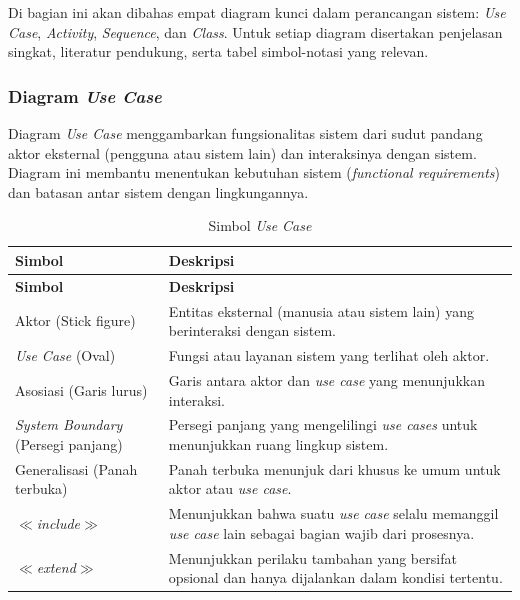 Di bagian ini akan dibahas empat diagram kunci dalam perancangan sistem: \textit{Use Case}, \textit{Activity}, \textit{Sequence}, dan \textit{Class}. Untuk setiap diagram disertakan penjelasan singkat, literatur pendukung, serta tabel simbol-notasi yang relevan.\par

\subsubsection{Diagram \textit{Use Case}} \label{II.DiagramUseCase}
Diagram \textit{Use Case} menggambarkan fungsionalitas sistem dari sudut pandang aktor eksternal (pengguna atau sistem lain) dan interaksinya dengan sistem. Diagram ini membantu menentukan kebutuhan sistem (\textit{functional requirements}) dan batasan antar sistem dengan lingkungannya.\par

\begin{longtable}{|p{}|p{}|}
	\caption{Simbol \textit{Use Case}}
	\label{table:2.simbolUseCase}\\
	\hline
	\textbf{Simbol} & \textbf{Deskripsi} \\
	\hline
	\endfirsthead
	\hline
	\textbf{Simbol} & \textbf{Deskripsi} \\
	\hline
	\endhead
	Aktor (Stick figure) & Entitas eksternal (manusia atau sistem lain) yang berinteraksi dengan sistem. \\
	\hline
	\textit{Use Case} (Oval) & Fungsi atau layanan sistem yang terlihat oleh aktor. \\
	\hline
	Asosiasi (Garis lurus) & Garis antara aktor dan \textit{use case} yang menunjukkan interaksi. \\
	\hline
	\textit{System Boundary} (Persegi panjang) & Persegi panjang yang mengelilingi \textit{use cases} untuk menunjukkan ruang lingkup sistem. \\
	\hline
	Generalisasi (Panah terbuka) & Panah terbuka menunjuk dari khusus ke umum untuk aktor atau \textit{use case}. \\
	\hline
	$\ll$\textit{include}$\gg$ & Menunjukkan bahwa suatu \textit{use case} selalu memanggil \textit{use case} lain sebagai bagian wajib dari prosesnya. \\
	\hline
	$\ll$\textit{extend}$\gg$ & Menunjukkan perilaku tambahan yang bersifat opsional dan hanya dijalankan dalam kondisi tertentu. \\
	\hline
\end{longtable}

